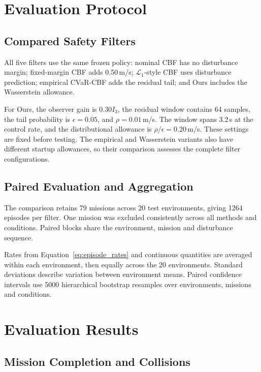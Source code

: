 \clearpage
\section{Evaluation Protocol}

\subsection{Compared Safety Filters}

All five filters use the same frozen policy: nominal CBF has no disturbance margin; fixed-margin CBF adds 0.50\,m/s; $\mathcal L_1$-style CBF uses disturbance prediction; empirical CVaR-CBF adds the residual tail; and Ours includes the Wasserstein allowance.

For Ours, the observer gain is $0.30I_3$, the residual window contains 64 samples, the tail probability is $\epsilon=0.05$, and $\rho=0.01$\,m/s. The window spans 3.2\,s at the control rate, and the distributional allowance is $\rho/\epsilon=0.20$\,m/s. These settings are fixed before testing. The empirical and Wasserstein variants also have different startup allowances, so their comparison assesses the complete filter configurations.

\subsection{Paired Evaluation and Aggregation}

The comparison retains 79 missions across 20 test environments, giving 1264 episodes per filter. One mission was excluded consistently across all methods and conditions. Paired blocks share the environment, mission and disturbance sequence.

Rates from Equation~\eqref{eq:episode_rates} and continuous quantities are averaged within each environment, then equally across the 20 environments. Standard deviations describe variation between environment means. Paired confidence intervals use 5000 hierarchical bootstrap resamples over environments, missions and conditions.

\clearpage
\section{Evaluation Results}
\label{sec:main_results}
\subsection{Mission Completion and Collisions}

